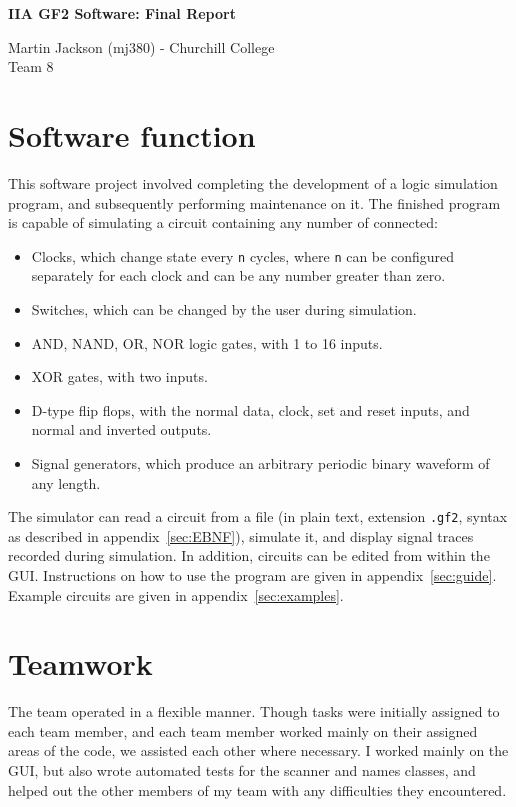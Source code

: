 \documentclass[a4paper,10pt]{article}
\begin{document}
\begin{center}
\LARGE \textbf{IIA GF2 Software: Final Report}

Martin Jackson (mj380) - Churchill College\\
Team 8
\end{center}

\tableofcontents{}\pagebreak

\section{Software function}
This software project involved completing the development of a logic simulation program, and subsequently performing maintenance on it. The finished program is capable of simulating a circuit containing any number of connected:
\begin{itemize}
\item Clocks, which change state every \texttt{n} cycles, where \texttt{n} can be configured separately for each clock and can be any number greater than zero.
\item Switches, which can be changed by the user during simulation.
\item AND, NAND, OR, NOR logic gates, with 1 to 16 inputs.
\item XOR gates, with two inputs.
\item D-type flip flops, with the normal data, clock, set and reset inputs, and normal and inverted outputs.
\item Signal generators, which produce an arbitrary periodic binary waveform of any length.
\end{itemize}

The simulator can read a circuit from a file (in plain text, extension \texttt{.gf2}, syntax as described in appendix~\ref{sec:EBNF}), simulate it, and display signal traces recorded during simulation. In addition, circuits can be edited from within the GUI. Instructions on how to use the program are given in appendix~\ref{sec:guide}. Example circuits are given in appendix~\ref{sec:examples}.

\section{Teamwork}
The team operated in a flexible manner. Though tasks were initially assigned to each team member, and each team member worked mainly on their assigned areas of the code, we assisted each other where necessary. I worked mainly on the GUI, but also wrote automated tests for the scanner and names classes, and helped out the other members of my team with any difficulties they encountered. 
\end{document}
